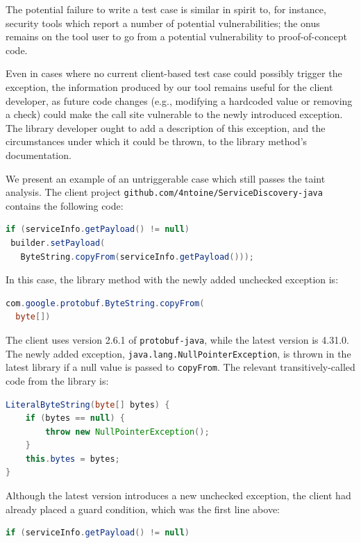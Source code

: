 The potential failure to write a test case is similar in spirit to, for instance, security tools which report a number of potential vulnerabilities; the onus remains on the tool user to go from a potential vulnerability to proof-of-concept code.

Even in cases where no current client-based test case could possibly trigger the exception, the information produced by our tool remains useful for the client developer, as future code changes (e.g., modifying a hardcoded value or removing a check) could make the call site vulnerable to the newly introduced exception. The library developer ought to add a description of this exception, and the circumstances under which it could be thrown, to the library method's documentation.

We present an example of an untriggerable case which still passes the taint analysis. The client project \texttt{github.com/4ntoine/ServiceDiscovery-java} contains the following code:

\begin{lstlisting}[language=Java]
if (serviceInfo.getPayload() != null)
 builder.setPayload(
   ByteString.copyFrom(serviceInfo.getPayload()));
\end{lstlisting}

In this case, the library method with the newly added unchecked exception is:

\begin{lstlisting}[language=Java]
com.google.protobuf.ByteString.copyFrom(
  byte[])
\end{lstlisting}

The client uses version 2.6.1 of \texttt{protobuf-java}, while the latest version is 4.31.0. The newly added exception, \texttt{java.lang.NullPointerException}, is thrown in the latest library if a null value is passed to \texttt{copyFrom}. The relevant transitively-called code from the library is:

\begin{lstlisting}[language=Java]
LiteralByteString(byte[] bytes) {
    if (bytes == null) {
        throw new NullPointerException();
    }
    this.bytes = bytes;
}
\end{lstlisting}

Although the latest version introduces a new unchecked exception, the client had already placed a guard condition, which was the first line above:

\begin{lstlisting}[language=Java]
  if (serviceInfo.getPayload() != null)
\end{lstlisting}

